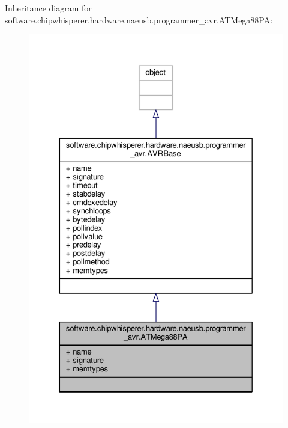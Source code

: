 Inheritance diagram for software.\+chipwhisperer.\+hardware.\+naeusb.\+programmer\+\_\+avr.\+A\+T\+Mega88\+P\+A\+:\nopagebreak
\begin{figure}[H]
\begin{center}
\leavevmode
\includegraphics[width=329pt]{d6/d20/classsoftware_1_1chipwhisperer_1_1hardware_1_1naeusb_1_1programmer__avr_1_1ATMega88PA__inherit__graph}
\end{center}
\end{figure}


